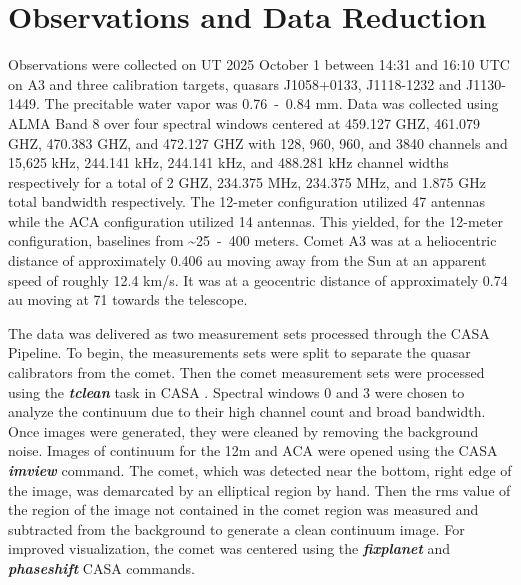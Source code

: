 \section{Observations and Data Reduction} \label{obs}

Observations were collected on UT 2025 October 1 between 14:31 and 16:10 UTC on A3 and three calibration targets, quasars J1058+0133, J1118-1232 and J1130-1449. The precitable water vapor was 0.76~-~0.84 mm. Data was collected using ALMA Band 8 over four spectral windows centered at 459.127 GHZ, 461.079 GHZ, 470.383 GHZ, and 472.127 GHZ with 128, 960, 960, and 3840 channels and 15,625 kHz, 244.141 kHz, 244.141 kHz, and 488.281 kHz channel widths respectively for a total of 2 GHZ, 234.375 MHz, 234.375 MHz, and 1.875 GHz total bandwidth respectively. The 12-meter configuration utilized 47 antennas while the ACA configuration utilized 14 antennas. This yielded, for the 12-meter configuration, baselines from \textasciitilde25~-~400 meters. Comet A3 was at a heliocentric distance of approximately 0.406 au moving away from the Sun at an apparent speed of roughly 12.4 km/s. It was at a geocentric distance of approximately 0.74 au moving at 71 \kms{} towards the telescope.

The data was delivered as two measurement sets processed through the CASA Pipeline. To begin, the measurements sets were split to separate the quasar calibrators from the comet. Then  the comet measurement sets were processed using the \emph{\textbf{tclean}} task in CASA \citep{CASA}. Spectral windows 0 and 3 were chosen to analyze the continuum due to their high channel count and broad bandwidth. Once images were generated, they were cleaned by removing the background noise. Images of continuum for the 12m and ACA were opened using the CASA \emph{\textbf{imview}} command. The comet, which was detected near the bottom, right edge of the image, was demarcated by an elliptical region by hand. Then the rms value of the region of the image not contained in the comet region was measured and subtracted from the background to generate a clean continuum image. For improved visualization, the comet was centered using the \emph{\textbf{fixplanet}} and \emph{\textbf{phaseshift}} CASA commands.

